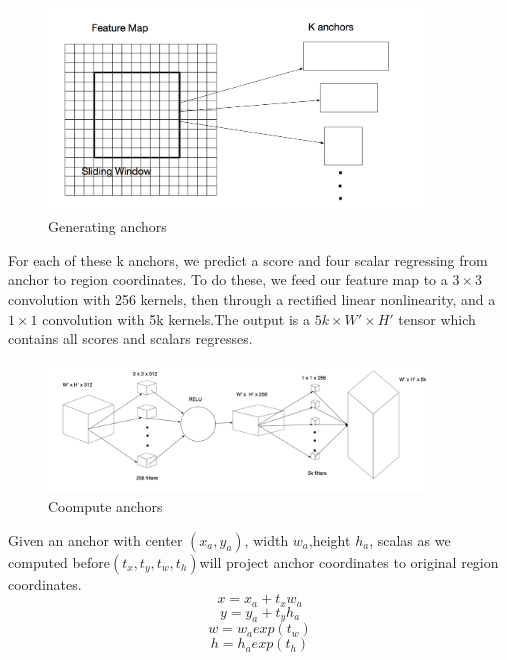 \documentclass[12pt,a4paper]{report}
\begin{document}
\begin{figure}[h]
\centering
\includegraphics[width=0.9\textwidth]{sliding.png}
\caption{Generating anchors}
\end{figure}

For each of these k anchors, we predict a score and four scalar regressing from anchor to region coordinates.
To do these, we feed our feature map to a $3\times 3$ convolution with 256 kernels, then through  a rectified linear nonlinearity, and a $1\times 1$ convolution with 5k kernels.The output is a $5k\times W'\times H'$ tensor which contains  all scores and scalars regresses.
\newpage
\begin{figure}[h]
\centering
\includegraphics[width=0.9\textwidth]{computeanchors.png}
\caption{Coompute anchors}
\end{figure}

Given an anchor with center $(x_a,y_a)$, width $w_a$,height $h_a$, scalas as we computed before$(t_x,t_y,t_w,t_h)$will project anchor coordinates to original region coordinates.
\[x=x_a+t_xw_a\]
\[y=y_a+t_yh_a\]
\[w=w_aexp(t_w)\]
\[h=h_aexp(t_h)\]
\end{document}
